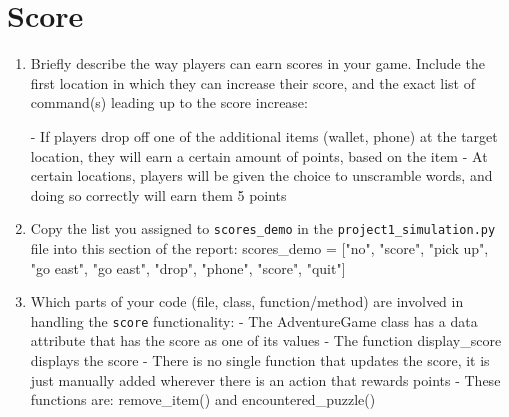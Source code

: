 \documentclass[11pt]{article}
\begin{document}
\section*{Score}
\begin{enumerate}

    \item Briefly describe the way players can earn scores in your game. Include the first location in which they can increase their score, and the exact list of command(s) leading up to the score increase:

        - If players drop off one of the additional items (wallet, phone) at the target location, they will earn a certain
        amount of points, based on the item
        - At certain locations, players will be given the choice to unscramble words, and doing so correctly will earn them
        5 points

    \item Copy the list you assigned to \texttt{scores\_demo} in the \texttt{project1\_simulation.py} file into this section of the report:
        scores_demo = ["no", "score", "pick up", "go east", "go east", "drop", "phone", "score", "quit"]

    \item Which parts of your code (file, class, function/method) are involved in handling the \texttt{score} functionality:
        - The AdventureGame class has a data attribute that has the score as one of its values
        - The function display_score displays the score
        - There is no single function that updates the score, it is just manually added wherever there is an action that rewards points
        - These functions are: remove_item() and encountered_puzzle()
\end{enumerate}
\end{document}
